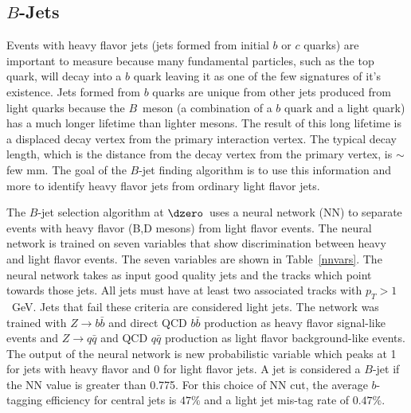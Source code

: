 \subsection{$B$-Jets}
\label{bidreco}
Events with heavy flavor jets (jets formed from initial $b$ or $c$ quarks) are important to measure because many fundamental particles, such as the top quark, will decay into a $b$ quark leaving it as one of the few signatures of it's existence. Jets formed from $b$ quarks are unique from other jets produced from light quarks because the $B$~meson (a combination of a $b$ quark and a light quark) has a much longer lifetime than lighter mesons. The result of this long lifetime is a displaced decay vertex from the primary interaction vertex. The typical decay length, which is the distance from the decay vertex from the primary vertex, is $\sim$few mm. The goal of the $B$-jet finding algorithm is to use this information and more to identify heavy flavor jets from ordinary light flavor jets.

The $B$-jet selection algorithm at $\dzero$~uses a neural network (NN) to separate events with heavy flavor (B,D mesons) from light flavor events. The neural network is trained on seven variables that show discrimination between heavy and light flavor events. The seven variables are shown in Table~\ref{nnvars}. The neural network takes as input good quality jets and the tracks which point towards those jets. All jets must have at least two associated tracks with $p_{T}>1$~GeV. Jets that fail these criteria are considered light jets. The network was trained with $Z\rightarrow b\bar{b}$ and direct QCD $b\bar{b}$ production as heavy flavor signal-like events and $Z\rightarrow q\bar{q}$ and QCD $q\bar{q}$ production as light flavor background-like events. The output of the neural network is new probabilistic variable which peaks at 1 for jets with heavy flavor and 0 for light flavor jets. A jet is considered a $B$-jet if the NN value is greater than 0.775. For this choice of NN cut, the average $b$-tagging efficiency for central jets is $47\%$ and a light jet mis-tag rate of $0.47\%$.

